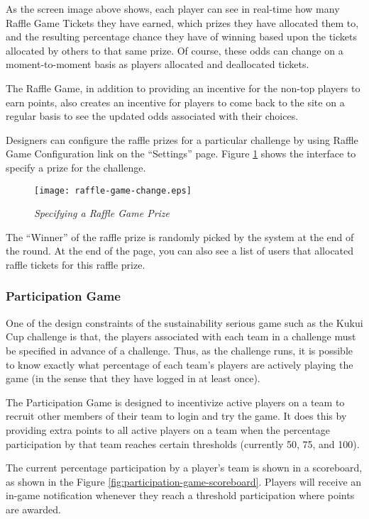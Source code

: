 As the screen image above shows, each player can see in real-time how many Raffle Game Tickets they have earned, which prizes they have allocated them to, and the resulting percentage chance they have of winning based upon the tickets allocated by others to that same prize. Of course, these odds can change on a moment-to-moment basis as players allocated and deallocated tickets.

The Raffle Game, in addition to providing an incentive for the non-top players to earn points, also creates an incentive for players to come back to the site on a regular basis to see the updated odds associated with their choices.

Designers can configure the raffle prizes for a particular challenge by using Raffle Game Configuration link on the ``Settings'' page. Figure \ref{fig:raffle-game-change} shows the interface to specify a prize for the challenge.

\begin{figure}[!ht]
  \center
  \texttt{[image: raffle-game-change.eps]}
  \caption{\em Specifying a Raffle Game Prize}
  \label{fig:raffle-game-change}
\end{figure}

The ``Winner'' of the raffle prize is randomly picked by the system at the end of the round. At the end of the page, you can also see a list of users that allocated raffle tickets for this raffle prize.

\clearpage

\subsubsection{Participation Game}

One of the design constraints of the sustainability serious game such as the Kukui Cup challenge is that, the players associated with each team in a challenge must be specified in advance of a challenge. Thus, as the challenge runs, it is possible to know exactly what percentage of each team's players are actively playing the game (in the sense that they have logged in at least once).

The Participation Game is designed to incentivize active players on a team to recruit other members of their team to login and try the game. It does this by providing extra points to all active players on a team when the percentage participation by that team reaches certain thresholds (currently 50, 75, and 100).

The current percentage participation by a player's team is shown in a scoreboard, as shown in the Figure \ref{fig:participation-game-scoreboard}. Players will receive an in-game notification whenever they reach a threshold participation where points are awarded.

